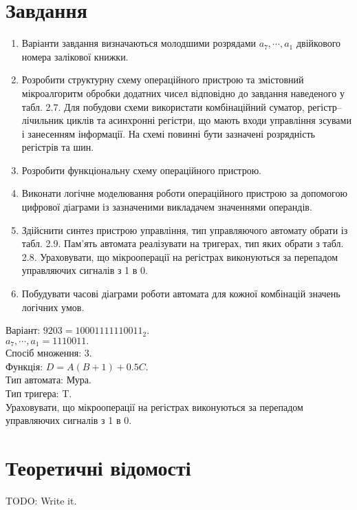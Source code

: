 \documentclass[a4paper, 10pt]{article}
\begin{document}
\section{Завдання}
\begin{enumerate}
    \item Варіанти завдання визначаються молодшими розрядами $a_{7},\cdots,a_{1}$ двійкового номера залікової книжки.
    \item Розробити структурну схему операційного пристрою та змістовний мікроалгоритм обробки  додатних чисел відповідно до завдання наведеного у табл. 2.7. Для побудови схеми використати комбінаційний суматор, регістр--лічильник циклів та асинхронні регістри, що мають входи управління зсувами і занесенням інформації. На схемі повинні бути зазначені розрядність регістрів та шин.
    \item Розробити функціональну схему операційного пристрою.
    \item Виконати логічне моделювання роботи операційного пристрою за допомогою цифрової діаграми  із зазначеними викладачем значеннями операндів.
    \item Здійснити синтез пристрою управління, тип управляючого автомату обрати із табл. 2.9. Пам’ять автомата реалізувати на тригерах, тип яких обрати з табл. 2.8. Ураховувати, що мікрооперації на регістрах виконуються за перепадом управляючих сигналів з 1 в 0.
    \item Побудувати часові діаграми роботи автомата для кожної комбінацій значень логічних умов.
\end{enumerate}
Варіант: $9203=10001111110011_2$.\\
$a_{7},\cdots,a_{1}=1110011.$\\
Спосіб множення: 3.\\
Функція: $D=A(B+1)+0.5C.$\\
Тип автомата: Мура.\\
Тип тригера: T.\\
Ураховувати, що мікрооперації на регістрах виконуються за перепадом управляючих сигналів з 1 в 0.

\section{Теоретичні відомості}
TODO: Write it.
\end{document}
